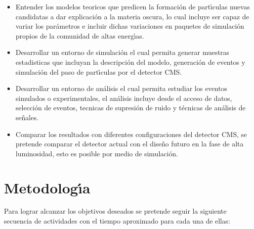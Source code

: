 \begin{itemize}
\item Entender los modelos teoricos que predicen la formaci\'on de part\'{\i}culas nuevas candidatas a dar explicaci\'on a la materia oscura, lo cual incluye ser capaz de variar los par\'ametros e incluir dichas variaciones en paquetes de simulaci\'on propios de la comunidad de altas energ\'{\i}as. 
\item Desarrollar un entorno de simulaci\'on el cual permita generar muestras estadisticas que incluyan la descripci\'on del modelo, generaci\'on de eventos y simulaci\'on del paso de part\'{\i}culas por el detector CMS. 
 \item Desarrollar un entorno de an\'alisis el cual permita estudiar los eventos simulados o experimentales, el an\'alisis incluye desde el acceso de datos, selecci\'on de eventos, tecnicas de supresi\'on de ruido y t\'ecnicas de an\'alisis de se\~nales. 
\item Comparar los resultados con diferentes configuraciones del detector CMS, se pretende comparar el detector actual con el dise\~no futuro en la fase de alta luminosidad, esto es posible por medio de simulaci\'on. 
  
\end{itemize}


\chapter{Metodolog\'{\i}a}

Para lograr alcanzar los objetivos deseados se pretende seguir la siguiente secuencia de actividades con el tiempo aproximado para cada una de ellas:

